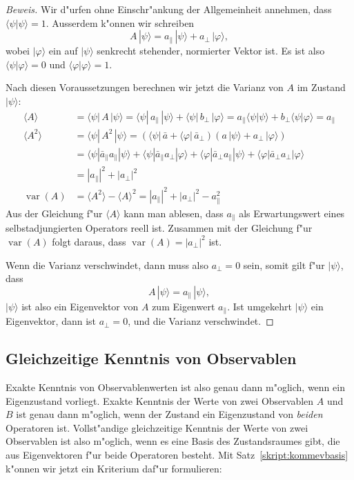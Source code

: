 \begin{proof}[Beweis]
Wir d"urfen ohne Einschr"ankung der Allgemeinheit annehmen, dass
$\langle\psi|\psi\rangle=1$. Ausserdem k"onnen wir schreiben
\[
A\,|\psi\rangle = a_{\|}\,|\psi\rangle + a_{\perp}\,|\varphi\rangle,
\]
wobei $|\varphi\rangle$ ein auf $|\psi\rangle$ senkrecht stehender,
normierter Vektor ist. Es ist also $\langle\psi|\varphi\rangle=0$
und $\langle\varphi|\varphi\rangle=1$.

Nach diesen Voraussetzungen berechnen wir jetzt die Varianz von $A$ im
Zustand $|\psi\rangle$:
\begin{align*}
\langle A\rangle
&=
\langle\psi|\,A\,|\psi\rangle
=
\langle\psi|\,a_{\|}\,|\psi\rangle
+
\langle\psi|\,b_{\perp}\,|\varphi\rangle
=
a_{\|}\langle\psi|\psi\rangle
+
b_{\perp}\langle\psi|\varphi\rangle
=
a_{\|}
\\
\langle A^2\rangle
&=
\langle\psi|\,A^2\,|\psi\rangle
=
(\langle\psi|\,\bar a + \langle\varphi|\,\bar a_{\perp})(a\,|\psi\rangle+a_{\perp}\,|\varphi\rangle)
\\
&=
\langle\psi|    \bar a_{\|} a_{\|} |\psi\rangle
+
\langle\psi|    \bar a_{\|} a_{\perp} |\varphi\rangle
+
\langle\varphi| \bar a_{\perp} a_{\|} |\psi\rangle
+
\langle\varphi| \bar a_{\perp} a_{\perp} |\varphi\rangle
\\
&=
|a_{\|}|^2+|a_{\perp}|^2
\\
\operatorname{var}(A)
&=
\langle A^2\rangle -\langle A\rangle^2
=
|a_{\|}|^2+|a_{\perp}|^2
-
a_{\|}^2
\end{align*}
Aus der Gleichung f"ur $\langle A\rangle$ kann man ablesen, dass $a_{\|}$ 
als Erwartungswert eines selbstadjungierten Operators reell ist.
Zusammen mit der Gleichung f"ur $\operatorname{var}(A)$ folgt daraus, dass
$
\operatorname{var}(A)=|a_{\perp}|^2
$ ist.

Wenn die Varianz verschwindet, dann muss also $a_{\perp}=0$ sein, somit
gilt f"ur $|\psi\rangle$, dass
\[
A\,|\psi\rangle = a_{\|}\,|\psi\rangle,
\]
$|\psi\rangle$ ist also ein Eigenvektor von $A$ zum Eigenwert $a_{\|}$.
Ist umgekehrt $|\psi\rangle$ ein Eigenvektor, dann ist $a_{\perp}=0$,
und die Varianz verschwindet.
\end{proof}

\subsection{Gleichzeitige Kenntnis von Observablen}
Exakte Kenntnis von Observablenwerten ist also genau dann m"oglich, wenn
ein Eigenzustand vorliegt.
Exakte Kenntnis der Werte von zwei Observablen $A$ und $B$ ist genau
dann m"oglich, wenn der Zustand ein Eigenzustand von {\em beiden }
Operatoren ist.
Vollst"andige gleichzeitige Kenntnis der Werte von zwei Observablen
ist also m"oglich, wenn es eine Basis des Zustandsraumes gibt, 
die aus Eigenvektoren f"ur beide Operatoren besteht. 
Mit Satz~\ref{skript:kommevbasis} k"onnen wir jetzt ein Kriterium
daf"ur formulieren:


